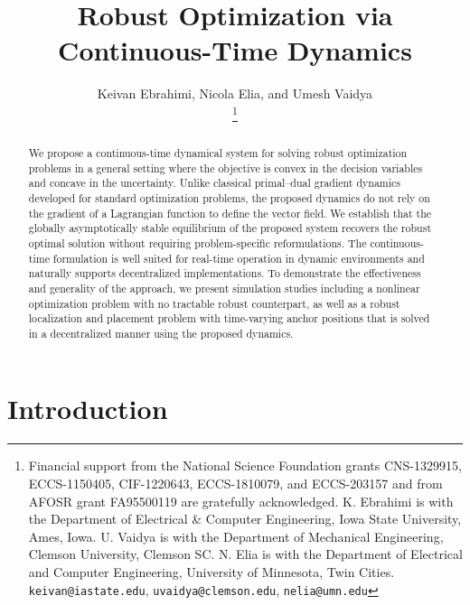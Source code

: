 \documentclass[journal,twoside,web]{ieeecolor}
\title{\LARGE \bf Robust Optimization via Continuous-Time Dynamics}
\author{Keivan Ebrahimi, Nicola Elia, and Umesh Vaidya\\
\thanks{Financial support from the National Science Foundation grants CNS-1329915, ECCS-1150405, CIF-1220643, ECCS-1810079, and ECCS-203157 and from AFOSR grant FA95500119 are gratefully acknowledged. K. Ebrahimi is with the Department of Electrical \& Computer Engineering, Iowa State University, Ames, Iowa. U. Vaidya is with the Department of Mechanical Engineering, Clemson University, Clemson SC.  N. Elia is with the Department of Electrical and Computer Engineering, University of Minnesota, Twin Cities.
{\tt\small keivan@iastate.edu},
{\tt\small uvaidya@clemson.edu},
{\tt\small nelia@umn.edu}
}}
\newcommand{\rev}[1]{#1}
\begin{document}
\pagestyle{headings}
\setcounter{page}{1}

\maketitle

\begin{abstract}
\rev{We propose a continuous-time dynamical system for solving robust optimization problems in a general setting where the objective is convex in the decision variables and concave in the uncertainty. Unlike classical primal–dual gradient dynamics developed for standard optimization problems, the proposed dynamics do not rely on the gradient of a Lagrangian function to define the vector field. We establish that the globally asymptotically stable equilibrium of the proposed system recovers the robust optimal solution without requiring problem-specific reformulations. The continuous-time formulation is well suited for real-time operation in dynamic environments and naturally supports decentralized implementations. To demonstrate the effectiveness and generality of the approach, we present simulation studies including a nonlinear optimization problem with no tractable robust counterpart, as well as a robust localization and placement problem with time-varying anchor positions that is solved in a decentralized manner using the proposed dynamics.}
\end{abstract}

\section{Introduction}
\end{document}
